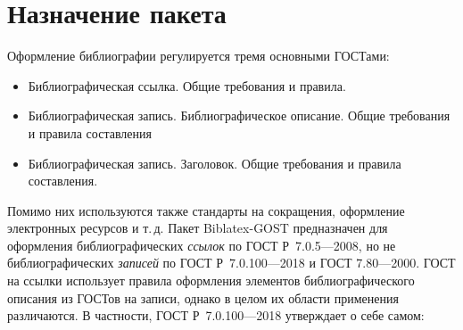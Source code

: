 \documentclass[10pt,a4paper,headings=small,numbers=enddot,english,russian]{ltxdockit}
\newcommand*{\biber}{Biber\xspace}
\newcommand*{\biblatex}{Biblatex\xspace}
\newcommand*{\biblatexgost}{Biblatex-GOST\xspace}
\newcommand*{\gostbibname}[1][]{ГОСТ#1 Р~7.0.100---2018\xspace}
\newcommand*{\gostcitename}[1][]{ГОСТ#1 Р~7.0.5---2008\xspace}
\newcommand*{\gostheadname}[1][]{ГОСТ#1 7.80---2000\xspace}
\begin{document}
%
%

\section{Назначение пакета}
\label{sec:whatfor}

Оформление библиографии регулируется тремя основными ГОСТами:

\newlength{\templ}\settowidth{\templ}{\gostbibname~}
\begin{itemize}[labelwidth=\templ,leftmargin=!,align=left,noitemsep]
\item[\gostcitename] Библиографическая ссылка. Общие требования и правила.
\item[\gostbibname] Библиографическая запись. Библиографическое описание. Общие
  требования и правила составления
\item[\gostheadname] Библиографическая запись. Заголовок. Общие требования и
  правила составления.
\end{itemize}
Помимо них используются также стандарты на сокращения, оформление электронных ресурсов и т.\,д.
Пакет \biblatexgost предназначен для оформления библиографических \emph{ссылок} по \gostcitename,
  но не библиографических \emph{записей} по \gostbibname и \gostheadname.
ГОСТ на ссылки использует правила оформления элементов библиографического описания из
  ГОСТов на записи, однако в целом их области применения различаются.
В частности, \gostbibname утверждает о себе самом:
\end{document}
